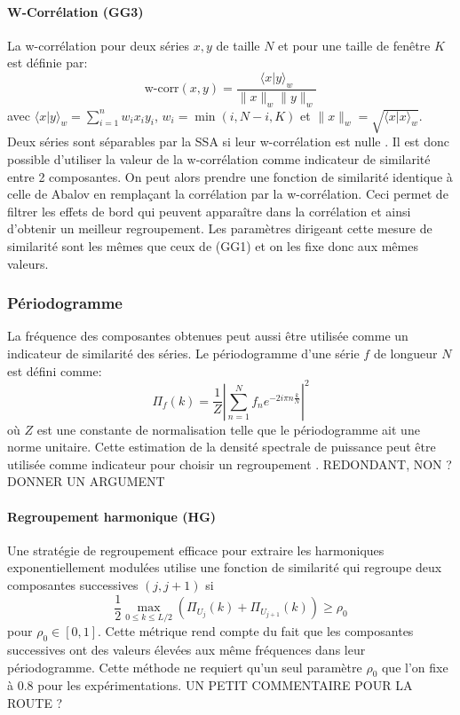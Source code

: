 \documentclass{gretsi}
\begin{document}
\paragraph{W-Corrélation (GG3)}\label{par:GG3} 
    La w-corrélation pour deux séries $x, y$ de taille $N$ et pour une taille de fenêtre $K$ est définie par:
    $$
    \text{w-corr}(x, y) = \frac{\langle x|y\rangle_w}{\|x\|_w\|y\|_w}
    $$avec $\langle x|y\rangle_w = \sum_{i=1}^n w_i x_i y_i$, $w_i = \min(i, N-i, K)$ et $\|x\|_w = \sqrt{\langle x|x\rangle_w}$. Deux séries sont séparables par la SSA si leur w-corrélation est nulle \cite{GNZ_10_SSA}. Il est donc possible d'utiliser la valeur de la w-corrélation comme indicateur de similarité entre 2 composantes. On peut alors prendre une fonction de similarité identique à celle de Abalov en remplaçant la corrélation par la w-corrélation. Ceci permet de filtrer les effets de bord qui peuvent apparaître dans la corrélation et ainsi d'obtenir un meilleur regroupement. Les paramètres dirigeant cette mesure de similarité sont les mêmes que ceux de (GG1) et on les fixe donc aux mêmes valeurs.


\subsubsection{Périodogramme}\label{ssub:per}

La fréquence des composantes obtenues peut aussi être utilisée comme un indicateur de similarité des séries. Le périodogramme d'une série $f$ de longueur $N$ est défini comme:
$$
\Pi_f(k) = \frac{1}{Z}\left|\sum_{n=1}^N f_n e^{-2i\pi n \frac{k}{N}}\right|^2
$$où $Z$ est une constante de normalisation telle que le périodogramme ait une norme unitaire. Cette estimation de la densité spectrale de puissance peut être utilisée  comme indicateur pour choisir un regroupement \cite{GNZ_10_SSA}. REDONDANT, NON ? DONNER UN ARGUMENT

\paragraph{Regroupement harmonique (HG)}\label{par:HG}
    Une stratégie de regroupement efficace pour extraire les harmoniques exponentiellement modulées \cite{alexandrov_05_auto} utilise une fonction de similarité qui regroupe deux composantes successives $(j, j+1)$ si 
    $$
    \frac{1}{2}\max_{0\le k \le L/2}\left(\Pi_{U_j}(k) + \Pi_{U_{j+1}}(k)\right) \ge \rho_0 
    $$pour $\rho_0\in \left[0, 1\right]$. Cette métrique rend compte du fait que les composantes successives ont des valeurs élevées aux même fréquences dans leur périodogramme. Cette méthode ne requiert qu'un seul paramètre $\rho_0$ que l'on fixe à 0.8 pour les expérimentations. UN PETIT COMMENTAIRE POUR LA ROUTE ?
\end{document}

